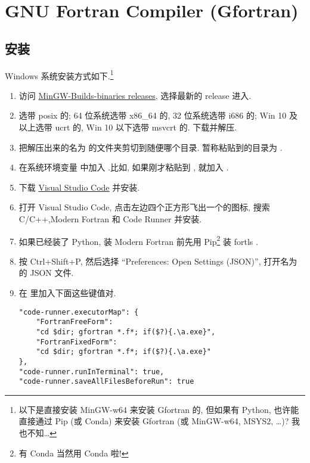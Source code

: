 \section[GNU Fortran Compiler]{GNU Fortran Compiler (Gfortran)}

\subsection{安装}

Windows 系统安装方式如下.\footnote{
    以下是直接安装 MinGW-w64 来安装 Gfortran 的, 但如果有 Python, 也许能直接通过 Pip (或 Conda) 来安装 Gfortran (或 MinGW-w64, MSYS2, \dots)? 我也不知\dots
}
\begin{enumerate}
    \item 访问 \href{https://github.com/niXman/mingw-builds-binaries/releases}
    {MinGW-Builds-binaries releases}, 选择最新的 release 进入.
    \item 选带 posix 的; 64 位系统选带 x86\_{}64 的, 32 位系统选带 i686 的; Win 10 及以上选带 ucrt 的, Win 10 以下选带 msvcrt 的. 下载并解压.
    \item 把解压出来的名为  的文件夹剪切到随便哪个目录. 暂称粘贴到的目录为 \ttt{[dir]}.
    \item 在系统环境变量  中加入 .比如, 如果刚才粘贴到 , 就加入 .
    \item 下载 \href{https://code.visualstudio.com/sha/download?build=stable&os=win32-x64-user}{Visual Studio Code} 并安装.
    \item 打开 Visual Studio Code, 点击左边四个正方形飞出一个的图标, 搜索 C/C++,Modern Fortran 和 Code Runner 并安装.
    \item[] 如果已经装了 Python, 装 Modern Fortran 前先用 Pip\footnote{有 Conda 当然用 Conda 啦!} 装 fortls .
    \item 按 Ctrl+Shift+P, 然后选择 ``Preferences: Open Settings (JSON)'', 打开名为  的 JSON 文件.
    \item 在  里加入下面这些键值对.\label{add_key_value}
    \begin{verbatim}
"code-runner.executorMap": {
    "FortranFreeForm":
    "cd $dir; gfortran *.f*; if($?){.\a.exe}",
    "FortranFixedForm":
    "cd $dir; gfortran *.f*; if($?){.\a.exe}"
},
"code-runner.runInTerminal": true,
"code-runner.saveAllFilesBeforeRun": true
    \end{verbatim}
\end{enumerate}
